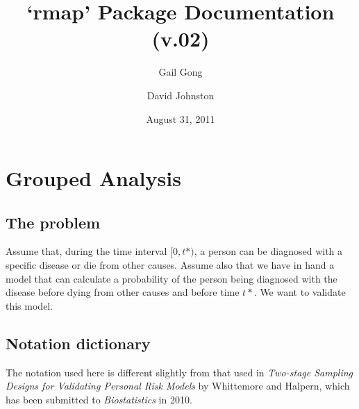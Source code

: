 \documentclass[11pt]{article}
\title{`rmap' Package Documentation (v.02)}
\date{August 31, 2011}
\author{Gail Gong \and David Johnston}
\begin{document}
\vspace{-80px}
\maketitle

\vspace{-70px}
\tableofcontents


\section{Grouped Analysis}
\subsection{The problem}
Assume that, during the time interval $[0, t*)$, a person can be diagnosed
with a specific disease or die from other causes.  Assume also that we
have in hand a model that can calculate a probability of the
person being diagnosed with the disease before dying from other causes
and before time $t*$. We want to validate this model. 


\subsection{Notation dictionary}
The notation used here is different slightly from that used in
\emph{Two-stage Sampling Designs for Validating Personal Risk Models}
by Whittemore and Halpern, which has been submitted to
\emph{Biostatistics} in 2010. 
 \\
\\

\end{document}

